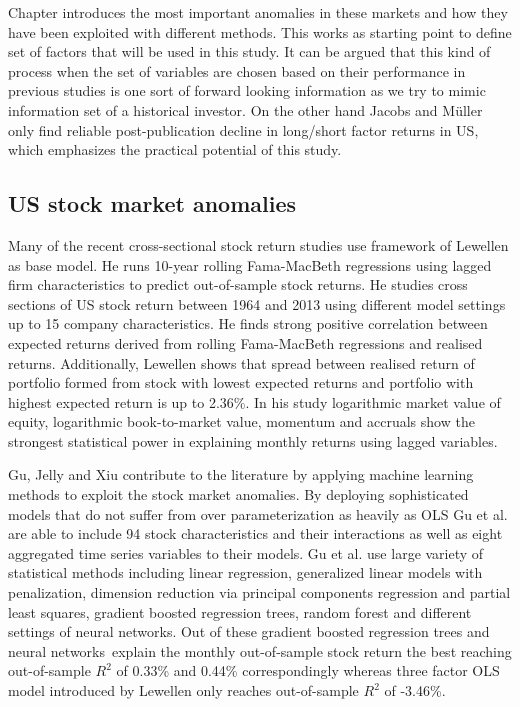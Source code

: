 \documentclass{article}
\begin{document}
Chapter introduces the most important anomalies in these markets and how they have been exploited with different methods. This works as starting point to define set of factors that will be used in this study. It can be argued that this kind of process when the set of variables are chosen based on their performance in previous studies is one sort of forward looking information as we try to mimic information set of a historical investor. On the other hand Jacobs and Müller \citeyear{JACOBS2020213} only find reliable post-publication decline in long/short factor returns in US, which emphasizes the practical potential of this study. \par

\subsection{US stock market anomalies}\label{USStockMarketAnomalies}

Many of the recent cross-sectional stock return studies use framework of Lewellen \citeyear{Lewellen2015} as base model. He runs 10-year rolling Fama-MacBeth regressions using lagged firm characteristics to predict out-of-sample stock returns. He studies cross sections of US stock return between 1964 and 2013 using different model settings up to 15 company characteristics. He finds strong positive correlation between expected returns derived from rolling Fama-MacBeth regressions and realised returns. Additionally, Lewellen shows that spread between realised return of portfolio formed from stock with lowest expected returns and portfolio with highest expected return is up to 2.36\%. In his study logarithmic market value of equity, logarithmic book-to-market value, momentum and accruals show the strongest statistical power in explaining monthly returns using lagged variables. \par

Gu, Jelly and Xiu \citeyear{guetal} contribute to the literature by applying machine learning methods to exploit the stock market anomalies. By deploying sophisticated models that do not suffer from over parameterization as heavily as OLS Gu et al. are able to include 94 stock characteristics and their interactions as well as eight aggregated time series variables to their models. Gu et al. use large variety of statistical methods including linear regression, generalized linear models with penalization, dimension reduction via principal components regression and partial least squares, gradient boosted regression trees, random forest and different settings of neural networks. Out of these gradient boosted regression trees and neural networks\footnotemark \ explain the monthly out-of-sample stock return the best reaching out-of-sample $R^{2}$ of 0.33\% and 0.44\% correspondingly whereas three factor OLS model introduced by Lewellen \citeyear{Lewellen2015} only reaches out-of-sample $R^{2}$ of -3.46\%. \par
\end{document}
